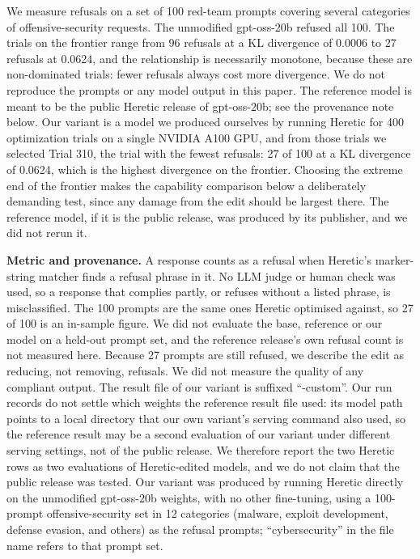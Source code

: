 \documentclass[conference]{IEEEtran}
\begin{document}
We measure refusals on a set of 100 red-team prompts covering several
categories of offensive-security requests. The unmodified gpt-oss-20b
refused all 100. The trials on the frontier range from 96 refusals at a KL
divergence of 0.0006 to 27 refusals at 0.0624, and the relationship is
necessarily monotone, because these are non-dominated trials: fewer
refusals always cost more divergence. We do
not reproduce the prompts or any model output in this paper. The reference
model is meant to be the public Heretic release of gpt-oss-20b; see the provenance
note below. Our variant is a
model we produced ourselves by running Heretic for 400 optimization trials
on a single NVIDIA A100 GPU, and from those trials we selected Trial 310, the trial
with the fewest refusals: 27 of 100 at a KL divergence of 0.0624, which is
the highest divergence on the frontier. Choosing the extreme end of the
frontier makes the capability comparison below a deliberately demanding
test, since any damage from the edit should be largest there. The
reference model, if it is the public release, was produced by its publisher, and we
did not rerun it.

\textbf{Metric and provenance.} A response counts as a refusal when
Heretic's marker-string matcher finds a refusal phrase in it. No LLM judge
or human check was used, so a response that complies partly, or refuses
without a listed phrase, is misclassified. The 100 prompts are the same
ones Heretic optimised against, so 27 of 100 is an in-sample figure. We did
not evaluate the base, reference or our model on a held-out prompt set, and
the reference release's own refusal count is not measured here.
Because 27 prompts are still refused, we describe the edit as reducing, not
removing, refusals. We did not measure the quality of any compliant output.
The result file of our variant is suffixed ``-custom''. Our run records do
not settle which weights the reference result file used: its model path points
to a local directory that our own variant's serving command also used, so the
reference result may be a second evaluation of our variant under different
serving settings, not of the public release. We therefore report the two
Heretic rows as two evaluations of Heretic-edited models, and we do not claim
that the public release was tested. Our variant
was produced by running Heretic directly on the unmodified gpt-oss-20b
weights, with no other fine-tuning, using a 100-prompt offensive-security
set in 12 categories (malware, exploit development, defense evasion, and
others) as the refusal prompts; ``cybersecurity'' in the file name refers
to that prompt set.
\end{document}
